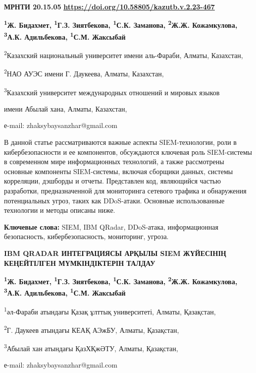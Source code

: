 \newpage
{\bfseries МРНТИ 20.15.05}
\hfill {\bfseries \href{https://doi.org/10.58805/kazutb.v.2.23-467}{https://doi.org/10.58805/kazutb.v.2.23-467}}


\begin{center}
{\bfseries \textsuperscript{1}Ж. Бидахмет, \textsuperscript{1}Г.З.
Зиятбекова\envelope, \textsuperscript{1}С.К. Заманова, \textsuperscript{2}Ж.Ж.
Кожамкулова, \textsuperscript{3}А.К. Адильбекова, \textsuperscript{1}С.М.
Жаксыбай}

\textsuperscript{2}Казахский национальный университет имени аль-Фараби,
Алматы, Казахстан,

\textsuperscript{2}НАО АУЭС имени Г. Даукеева, Алматы, Казахстан,

\textsuperscript{3}Казахский университет международных отношений и
мировых языков

имени Абылай хана, Алматы, Казахстан,

е-mail: zhaksybaysanzhar@gmail.com
\end{center}

В данной статье рассматриваются важные аспекты SIEM-технологии, роли в
кибербезопасности и ее компонентов, обсуждаются ключевая роль
SIEM-системы в современном мире информационных технологий, а также
рассмотрены основные компоненты SIEM-системы, включая сборщики данных,
системы корреляции, дэшборды и отчеты. Представлен код, являющийся
частью разработки, предназначенной для мониторинга сетевого трафика и
обнаружения потенциальных угроз, таких как DDoS-атаки. Основные
использованные технологии и методы описаны ниже.

{\bfseries Ключевые слова:} SIEM, IBM QRadar, DDoS-атака, информационная
безопасность, кибербезопасность, мониторинг, угроза.

\begin{center}
{\large\bfseries IBM QRADAR ИНТЕГРАЦИЯСЫ АРҚЫЛЫ SIEM ЖҮЙЕСІНІҢ КЕҢЕЙТІЛГЕН
МҮМКІНДІКТЕРІН ТАЛДАУ}

{\bfseries \textsuperscript{1}Ж. Бидахмет, \textsuperscript{1}Г.З.
Зиятбекова\envelope, \textsuperscript{1}С.К. Заманова, \textsuperscript{2}Ж.Ж.
Кожамкулова, \textsuperscript{3}А.К. Адильбекова, \textsuperscript{1}С.М.
Жаксыбай}

\textsuperscript{1}әл-Фараби атындағы Қазақ ұлттық университеті, Алматы,
Қазақстан,

\textsuperscript{2}Г. Даукеев атындағы КЕАҚ АЭжБУ, Алматы, Қазақстан,

\textsuperscript{3}Абылай хан атындағы ҚазХҚжӘТУ, Алматы, Қазақстан,

е-mail: zhaksybaysanzhar@gmail.com
\end{center}

